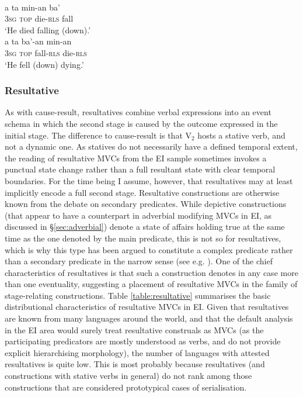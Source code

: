 \ea
{}\\
\ea \label{Teiwa_1}
\gll a ta min-an ba' \\
3\textsc{sg} \textsc{top} die-\textsc{rls} fall \\
\glft `He died falling (down).' \\ 
\ex \label{Teiwa_2}
\gll a ta ba'-an min-an \\ 
3\textsc{sg} \textsc{top} fall-\textsc{rls} die-\textsc{rls} \\
\glft `He fell (down) dying.'\\ 
\z
\z

\subsubsection{Resultative} \label{sec:resultative}

As with cause-result, resultatives combine verbal expressions into an event schema in which the second stage is caused by the outcome expressed in the initial stage. The difference to cause-result is that V$_2$ hosts a stative verb, and not a dynamic one. As statives do not necessarily have a defined temporal extent, the reading of resultative MVCs from the EI sample sometimes invokes a punctual state change rather than a full resultant state with clear temporal boundaries. For the time being I assume, however, that resultatives may at least implicitly encode a full second stage. Resultative constructions are otherwise known from
the debate on secondary predicates. While depictive constructions (that appear to have a counterpart in adverbial modifying MVCs in EI, as discussed in §\ref{sec:adverbial}) denote a state of affairs holding true at the same time as the one denoted by the main predicate, this is not so for resultatives, which is why this type has been argued to constitute a complex predicate rather than a secondary predicate in the narrow sense (see e.g. \citealt[66]{schultze2004depictive}). One of the chief characteristics of resultatives is that such a construction denotes in any case more than one eventuality, suggesting a placement of resultative MVCs in the family of stage-relating constructions. Table \ref{table:resultative} summarises the basic distributional characteristics of resultative MVCs in EI. Given that resultatives are known from many languages around the world, and that the default analysis in the EI area would surely treat resultative construals as MVCs (as the participating predicators are mostly understood as verbs, and do not provide explicit hierarchising morphology), the number of languages with attested resultatives is quite low. This is most probably because resultatives (and constructions with stative verbs in general) do not rank among those constructions that are considered prototypical cases of serialisation.

